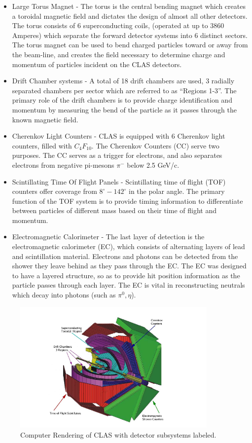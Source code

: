 \begin{itemize}
\item Large Torus Magnet - The torus is the central bending magnet which creates a toroidal magnetic field and dictates the design of almost all other detectors.  The torus consists of 6 superconducting coils, (operated at up to 3860 Amperes) which separate the forward detector systems into 6 distinct sectors.  The torus magnet can be used to bend charged particles toward or away from the beam-line, and creates the field necessary to determine charge and momentum of particles incident on the CLAS detectors.  
\item Drift Chamber systems - A total of 18 drift chambers are used, 3 radially separated chambers per sector which are referred to as ``Regions 1-3''.  The primary role of the drift chambers is to provide charge identification and momentum by measuring the bend of the particle as it passes through the known magnetic field.    
\item Cherenkov Light Counters - CLAS is equipped with 6 Cherenkov light counters, filled with $C_{4} F_{10}$.  The Cherenkov Counters (CC) serve two purposes.  The CC serves as a trigger for electrons, and also separates electrons from negative pi-mesons $\pi^{-}$ below 2.5 GeV/c.
\item Scintillating Time Of Flight Panels - Scintillating time of flight (TOF) counters offer coverage from $8^{\circ} - 142^{\circ}$ in the polar angle.  The primary function of the TOF system is to provide timing information to differentiate between particles of different mass based on their time of flight and momentum.  
\item Electromagnetic Calorimeter - The last layer of detection is the electromagnetic calorimeter (EC), which consists of alternating layers of lead and scintillation material.  Electrons and photons can be detected from the shower they leave behind as they pass through the EC.  The EC was designed to have a layered structure, so as to provide hit position information as the particle passes through each layer.  The EC is vital in reconstructing neutrals which decay into photons (such as $\pi^0, \eta$). 
\end{itemize}

\begin{figure}
  \centering
  \includegraphics[width=10cm]{image/CLAS.png}
  \caption{ Computer Rendering of CLAS with detector subsystems labeled.}
  \label{fig:clas}
\end{figure}

